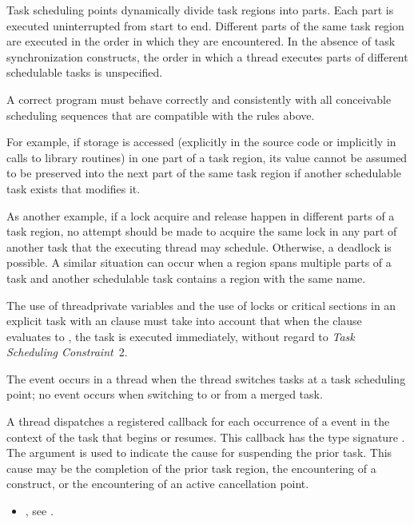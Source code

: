 \begin{note}
Task scheduling points dynamically divide task regions into parts. Each part is
executed uninterrupted from start to end. Different parts of the same task region are
executed in the order in which they are encountered. In the absence of task
synchronization constructs, the order in which a thread executes parts of different
schedulable tasks is unspecified.

A correct program must behave correctly and consistently with all conceivable
scheduling sequences that are compatible with the rules above.

For example, if  storage is accessed (explicitly in the source code or
implicitly in calls to library routines) in one part of a task region, its value cannot be
assumed to be preserved into the next part of the same task region if another schedulable
task exists that modifies it.

As another example, if a lock acquire and release happen in different parts of a task
region, no attempt should be made to acquire the same lock in any part of another task
that the executing thread may schedule. Otherwise, a deadlock is possible. A similar
situation can occur when a  region spans multiple parts of a task and another
schedulable task contains a  region with the same name.

The use of threadprivate variables and the use of locks or critical sections in an explicit
task with an  clause must take into account that when the  clause evaluates to
, the task is executed immediately, without regard to \emph{Task Scheduling Constraint}~2.
\end{note}

\events

The  event occurs in a thread when the thread switches tasks at a task scheduling point;
no event occurs when switching to or from a merged task.

\tools

A thread dispatches a registered 
callback for each occurrence of a  event in
the context of the task that begins or resumes. This callback has the type signature
.
The argument   is used to indicate the cause for suspending the prior task.
This cause may be the completion of the prior task region, the encountering of a
 construct, or the encountering of an active cancellation point.

\crossreferences
\begin{itemize}
\item {}, see
.
\end{itemize}

